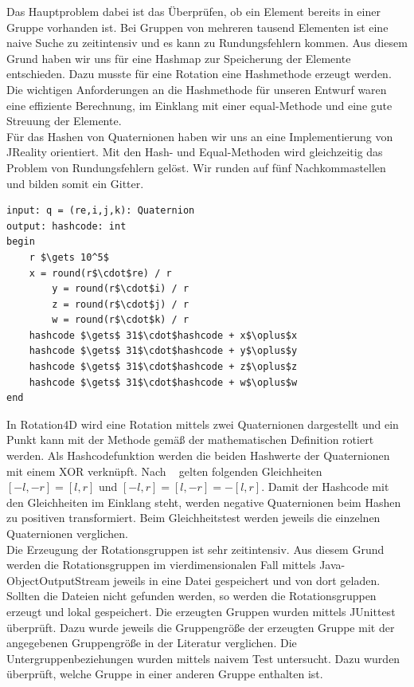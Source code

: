 Das Hauptproblem dabei ist das Überprüfen, ob ein Element bereits in einer Gruppe vorhanden ist. Bei Gruppen von mehreren tausend Elementen ist eine naive Suche zu zeitintensiv und es kann zu Rundungsfehlern kommen. Aus diesem Grund haben wir uns für eine Hashmap zur Speicherung der Elemente entschieden. Dazu musste für eine Rotation eine Hashmethode erzeugt werden. Die wichtigen Anforderungen an die Hashmethode für unseren Entwurf waren eine effiziente Berechnung, im Einklang mit einer equal-Methode und eine gute Streuung der Elemente.\\
Für das Hashen von Quaternionen haben wir uns an eine Implementierung von JReality orientiert. Mit den Hash- und Equal-Methoden wird gleichzeitig das Problem von Rundungsfehlern gelöst. Wir runden auf fünf Nachkommastellen und bilden somit ein Gitter. 
\begin{lstlisting}[mathescape, morekeywords={for, each, if, then, fi, do, begin,input, output, end, return}, caption={Peusdocode der Berechnung des Hashwerts eines Quaternions}, label=alg:hash]
input: q = (re,i,j,k): Quaternion
output: hashcode: int
begin	
	r $\gets 10^5$
	x = round(r$\cdot$re) / r
    	y = round(r$\cdot$i) / r
    	z = round(r$\cdot$j) / r
    	w = round(r$\cdot$k) / r
	hashcode $\gets$ 31$\cdot$hashcode + x$\oplus$x
	hashcode $\gets$ 31$\cdot$hashcode + y$\oplus$y
	hashcode $\gets$ 31$\cdot$hashcode + z$\oplus$z
	hashcode $\gets$ 31$\cdot$hashcode + w$\oplus$w
end 
\end{lstlisting}
In Rotation4D wird eine Rotation mittels zwei Quaternionen dargestellt und ein Punkt kann mit der Methode gemäß der mathematischen Definition rotiert werden. Als Hashcodefunktion werden die beiden Hashwerte der Quaternionen mit einem XOR verknüpft. Nach ~\cite{conway2003} gelten folgenden Gleichheiten
$[-l,-r] = [l,r]$ und $[-l,r]=[l,-r]=-[l,r]$. Damit der Hashcode mit den Gleichheiten im Einklang steht, werden negative Quaternionen beim Hashen zu positiven transformiert. Beim Gleichheitstest werden jeweils die einzelnen Quaternionen verglichen.\\
Die Erzeugung der Rotationsgruppen ist sehr zeitintensiv. Aus diesem Grund werden die Rotationsgruppen im vierdimensionalen Fall mittels Java-ObjectOutputStream jeweils in eine Datei gespeichert und von dort geladen. Sollten die Dateien nicht gefunden werden, so werden die Rotationsgruppen erzeugt und lokal gespeichert. Die erzeugten Gruppen wurden mittels JUnittest überprüft. Dazu wurde jeweils die Gruppengröße der erzeugten Gruppe mit der angegebenen Gruppengröße in der Literatur verglichen. Die Untergruppenbeziehungen wurden mittels naivem Test untersucht. Dazu wurden überprüft, welche Gruppe in einer anderen Gruppe enthalten ist.\\
